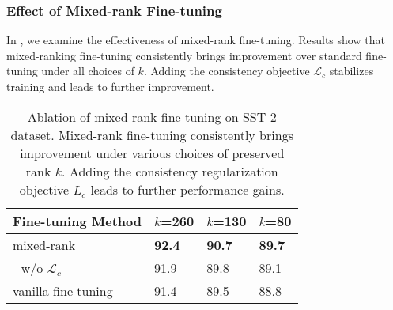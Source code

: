 \subsubsection{Effect of Mixed-rank Fine-tuning} In , we examine the effectiveness of mixed-rank fine-tuning. Results show that mixed-ranking fine-tuning consistently brings improvement over standard fine-tuning under all choices of $k$. Adding the consistency objective $\mathcal{L}_{c}$  stabilizes training and leads to further improvement. 
\begin{table}[t]
	\centering
	\footnotesize
	\begin{tabular}{l|lll}
		\toprule
		Fine-tuning Method & $k$=260& $k$=130 & $k$=80   \\
		\midrule
		mixed-rank &\textbf{92.4}     & \textbf{90.7}   & \textbf{89.7}  \\
		- w/o $\mathcal{L}_{c}$  &91.9  &89.8   &89.1  \\
		\midrule
		vanilla fine-tuning &91.4 & 89.5   &88.8  	 \\
		\bottomrule
	\end{tabular}
	\caption{Ablation of mixed-rank fine-tuning on SST-2 dataset. Mixed-rank fine-tuning consistently brings improvement under various choices of preserved rank $k$. Adding the consistency regularization objective $L_c$ leads to further performance gains.}
	\label{table:wwomixedrank}
\end{table}

